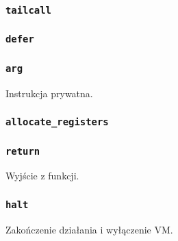 \subsubsection{\texttt{tailcall}}
\subsubsection{\texttt{defer}}
\subsubsection{\texttt{arg}}

Instrukcja prywatna.

\subsubsection{\texttt{allocate\_registers}}

\subsubsection{\texttt{return}}

Wyjście z funkcji.

\subsubsection{\texttt{halt}}

Zakończenie działania i wyłączenie VM.
